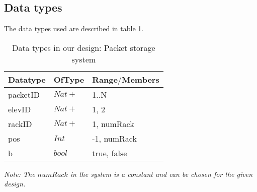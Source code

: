 \subsection*{Data types}
The data types used are described in table \ref{tab: data_types}.
\begin{table}[h]
\centering
\begin{tabular}{|l|l|l|}\hline
Datatype & OfType & Range$\slash$Members\\\hline
packetID & $Nat+$ & { 1..N} \\\hline
elevID & $Nat+$ & { 1, 2}\\\hline
rackID & $Nat+$ & { 1, numRack}\\\hline
pos & $Int$ & {-1, numRack}\\\hline
b & $bool$ & {true, false} \\\hline
\end{tabular}
\caption{Data types in our design: Packet storage system }
\label{tab: data_types}
\end{table}

\textit{Note: The $numRack$ in the system is a constant and can be chosen for the given design.}
